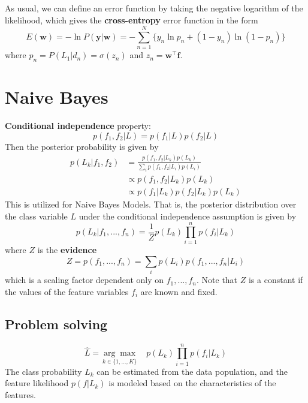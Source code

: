\documentclass{article}
\begin{document}
    As usual, we can define an error function by taking the negative logarithm of the likelihood, which gives the {\bf cross-entropy} error function in the form
    \begin{equation}
        E(\boldsymbol{w})
        = -\ln P(\boldsymbol{y} | \boldsymbol{w})
        = -\sum_{n=1}^N \big\{ 
                y_n \ln p_n + (1-y_n)\ln(1-p_n)
                \big\}
    \end{equation}
    where $p_n = P(L_1|d_n) = \sigma(z_n)$ and 
    $z_n = \boldsymbol{w}^\top \boldsymbol{f}$.
    
\section{Naive Bayes}
{\bf Conditional independence} property:
\begin{equation}
    p(f_1, f_2 | L) = p(f_1 | L) p(f_2 | L)
\end{equation}
Then the posterior probability is given by
\begin{align}
    p(L_k | f_1, f_2) & = \frac{ p(f_1, f_2 | L_k) p(L_k) }{\sum_i p(f_1,f_2|L_i)p(L_i)}  \\
      & \propto p(f_1, f_2 | L_k) p(L_k) \\
      & \propto p(f_1 | L_k) p(f_2 | L_k) p(L_k) 
\end{align}
This is utilized for Naive Bayes Models.
That is, the posterior distribution over the class variable $L$ under the conditional independence assumption is given by
\begin{equation}
    p(L_k | f_1, ..., f_n) = \frac{1}{Z} p(L_k) \prod_{i=1}^n p(f_i | L_k)
\end{equation}
where $Z$ is the {\bf evidence}
\begin{equation}
    Z = p(f_1, ..., f_n) = \sum_i p(L_i) p(f_1,...,f_n|L_i)
\end{equation}
which is a scaling factor dependent only on $f_1, ..., f_n$. Note that $Z$ is a constant if the values of the feature variables $f_i$ are known and fixed.

\subsection{Problem solving}
\begin{equation}
    \hat L = \underset{k\in\{1,...,K\}}{\arg\max} \quad p(L_k) \prod_{i=1}^n p(f_i | L_k)
\end{equation}
The class probability $L_k$ can be estimated from the data population, and the feature likelihood $p(f|L_k) $ is modeled based on the characteristics of the features.
\end{document}
